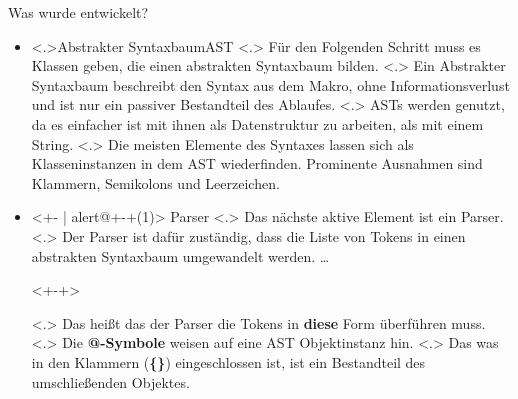 \begin{frame}{Was wurde entwickelt?}
\begin{itemize}[<+- | alert@+>]
      \item
        \temporal<.>{}{Abstrakter Syntaxbaum}{AST}
            \note[item]<.>{
              Für den Folgenden Schritt muss es Klassen geben, die einen abstrakten Syntaxbaum bilden.
            }
            \note[item]<.>{
              Ein Abstrakter Syntaxbaum beschreibt den Syntax aus dem Makro, ohne Informationsverlust und ist nur ein passiver Bestandteil des Ablaufes.
            }
            \note[item]<.>{
              ASTs werden genutzt, da es einfacher ist mit ihnen als Datenstruktur zu arbeiten, als mit einem String.
            }
            \note[item]<.>{
              Die meisten Elemente des Syntaxes lassen sich als Klasseninstanzen in dem AST wiederfinden. Prominente Ausnahmen sind Klammern, Semikolons und Leerzeichen.
            }
      \item<+- | alert@+-+(1)>
        Parser%
            \note[item]<.>{
              Das nächste aktive Element ist ein Parser.
            }
            \note[item]<.>{
              Der Parser ist dafür zuständig, dass die Liste von Tokens in einen abstrakten Syntaxbaum umgewandelt werden.
              \ldots
            }%
        \begin{uncoverenv}<+-+>%
        \end{uncoverenv}%
            \note[item]<.>{
              Das heißt das der Parser die Tokens in \textbf{diese} Form überführen muss.
            }%
            \note[item]<.>{
              Die \textbf{@-Symbole} weisen auf eine AST Objektinstanz hin.
            }%
            \note[item]<.>{
              Das was in den Klammern (\textbf{\{\}}) eingeschlossen ist, ist ein Bestandteil des umschließenden Objektes.
}
\end{itemize}
\end{frame}
